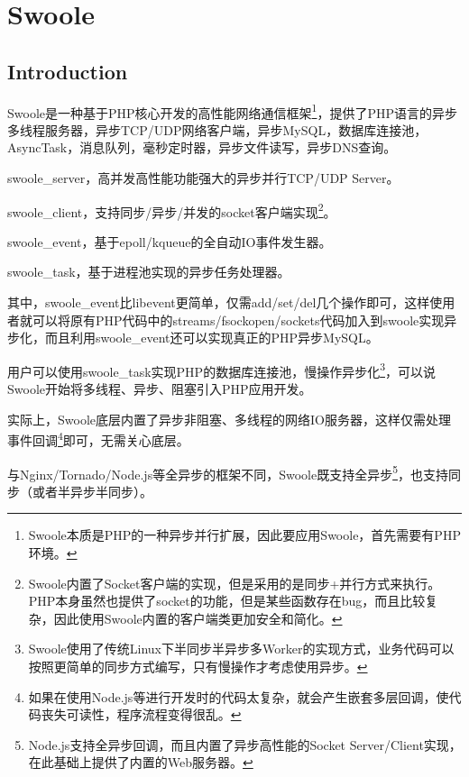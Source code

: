 \part{Swoole}



\chapter{Introduction}


Swoole是一种基于PHP核心开发的高性能网络通信框架\footnote{Swoole本质是PHP的一种异步并行扩展，因此要应用Swoole，首先需要有PHP环境。}，提供了PHP语言的异步多线程服务器，异步TCP/UDP网络客户端，异步MySQL，数据库连接池，AsyncTask，消息队列，毫秒定时器，异步文件读写，异步DNS查询。

\begin{compactitem}
\item swoole\_server，高并发高性能功能强大的异步并行TCP/UDP Server。
\item swoole\_client，支持同步/异步/并发的socket客户端实现\footnote{Swoole内置了Socket客户端的实现，但是采用的是同步+并行方式来执行。PHP本身虽然也提供了socket的功能，但是某些函数存在bug，而且比较复杂，因此使用Swoole内置的客户端类更加安全和简化。}。
\item swoole\_event，基于epoll/kqueue的全自动IO事件发生器。
\item swoole\_task，基于进程池实现的异步任务处理器。
\end{compactitem}

其中，swoole\_event比libevent更简单，仅需add/set/del几个操作即可，这样使用者就可以将原有PHP代码中的streams/fsockopen/sockets代码加入到swoole实现异步化，而且利用swoole\_event还可以实现真正的PHP异步MySQL。

用户可以使用swoole\_task实现PHP的数据库连接池，慢操作异步化\footnote{Swoole使用了传统Linux下半同步半异步多Worker的实现方式，业务代码可以按照更简单的同步方式编写，只有慢操作才考虑使用异步。}，可以说Swoole开始将多线程、异步、阻塞引入PHP应用开发。

实际上，Swoole底层内置了异步非阻塞、多线程的网络IO服务器，这样仅需处理事件回调\footnote{如果在使用Node.js等进行开发时的代码太复杂，就会产生嵌套多层回调，使代码丧失可读性，程序流程变得很乱。}即可，无需关心底层。

与Nginx/Tornado/Node.js等全异步的框架不同，Swoole既支持全异步\footnote{Node.js支持全异步回调，而且内置了异步高性能的Socket Server/Client实现，在此基础上提供了内置的Web服务器。}，也支持同步（或者半异步半同步）。




